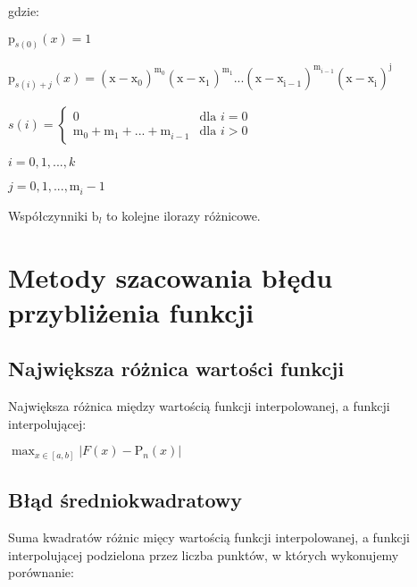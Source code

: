 \documentclass{article}
\begin{document}
\noindent
gdzie:

\bigbreak

\(\mathrm{p}_{s(0)}^{}(x) = 1\) 

\indent

\(\mathrm{p}_{s(i) + j}^{}(x) = \mathrm{(\mathrm{x - \mathrm{x}_{0}^{}}_{}^{})}_{}^{\mathrm{m}_{0}^{}}
\mathrm{(\mathrm{x - \mathrm{x}_{1}^{}}_{}^{})}_{}^{\mathrm{m}_{1}^{}}...
\mathrm{(\mathrm{x - \mathrm{x}_{i - 1}^{}}_{}^{})}_{}^{\mathrm{m}_{i-1}^{}}
\mathrm{(\mathrm{x - \mathrm{x}_{i}^{}}_{}^{})}_{}^{\mathrm{j}_{}^{}}\)

\indent

\(
s(i) = 
\begin{cases}
    0 & \text{dla } i = 0 \\
    \mathrm{m}_{0}^{} + \mathrm{m}_{1}^{} + ... + \mathrm{m}_{i - 1}^{} & \text{dla } i > 0
\end{cases}
\)

\indent

\(i = 0, 1, ..., k\)

\indent

\(j = 0,1,...,\mathrm{m}_{i}^{} - 1\)

\indent

Współczynniki \(\mathrm{b}_{l}^{}\) to kolejne ilorazy różnicowe.

\section{Metody szacowania błędu przybliżenia funkcji}

\subsection{Największa różnica wartości funkcji}

Największa różnica między wartością funkcji interpolowanej, a funkcji interpolującej:

\begin{center}
    \(\max_{x\in [a, b]} |F(x) - \mathrm{P}_{n}^{}(x)|\)
\end{center}

\subsection{Błąd średniokwadratowy}

Suma kwadratów różnic mięcy wartością funkcji interpolowanej, a funkcji interpolującej podzielona przez liczba punktów, w których wykonujemy porównanie:
\end{document}
